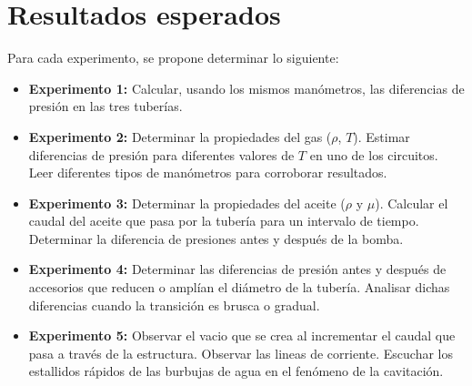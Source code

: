 \documentclass[12pt, a4paper]{exam}
\begin{document}
\section{Resultados esperados}
Para cada experimento, se propone determinar lo siguiente:
\begin{itemize}
\item \textbf{Experimento 1:} Calcular, usando los mismos man\'ometros, las diferencias de presi\'on en las tres tuber\'ias. 
\item \textbf{Experimento 2:} Determinar la propiedades del gas ($\rho$, $T$). Estimar diferencias de presi\'on para diferentes valores de $T$ en uno de los circuitos. Leer diferentes tipos de man\'ometros para corroborar resultados.  
\item \textbf{Experimento 3:} Determinar la propiedades del aceite ($\rho$ y $\mu$). Calcular el caudal del aceite que pasa por la tuber\'ia para un intervalo de tiempo. Determinar la diferencia de presiones antes y despu\'es de la bomba.
\item \textbf{Experimento 4:} Determinar las diferencias de presi\'on antes y despu\'es de accesorios que reducen o ampl\'ian el di\'ametro de la tuber\'ia. Analisar dichas diferencias cuando la transici\'on es brusca o gradual.
\item \textbf{Experimento 5:} Observar el vacio que se crea al incrementar el caudal que pasa a trav\'es de la estructura. Observar las lineas de corriente. Escuchar los estallidos r\'apidos de las burbujas de agua en el fen\'omeno de la cavitaci\'on. 
\end{itemize}
\end{document}
